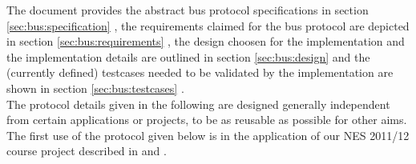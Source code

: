 The document provides the abstract bus protocol specifications 
in section \ref{sec:bus:specification} , the requirements claimed 
for the bus protocol are depicted in section \ref{sec:bus:requirements} , 
the design choosen for the implementation and the 
implementation details are outlined in section \ref{sec:bus:design}  
and the (currently defined) testcases needed to be validated by 
the implementation are shown in section \ref{sec:bus:testcases} .\\

The protocol details given in the following are 
designed generally independent from certain 
applications or projects, to be as reusable 
as possible for other aims. 
The first use of the protocol given below is in the application 
of our NES 2011/12 course project described in \cite[NESD1]{NESD1} and \cite[NESD3]{NESD3}.\\
 